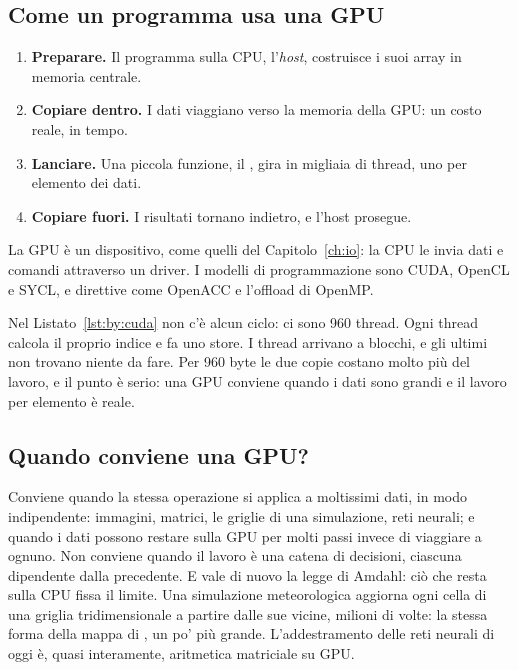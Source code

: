 \subsection{Come un programma usa una GPU}

\begin{enumerate}
\item \textbf{Preparare.} Il programma sulla CPU, l'\emph{host}, costruisce i
  suoi array in memoria centrale.
\item \textbf{Copiare dentro.} I dati viaggiano verso la memoria della GPU: un
  costo reale, in tempo.
\item \textbf{Lanciare.} Una piccola funzione, il , gira in
  migliaia di thread, uno per elemento dei dati.
\item \textbf{Copiare fuori.} I risultati tornano indietro, e l'host prosegue.
\end{enumerate}

La GPU è un dispositivo, come quelli del Capitolo~\ref{ch:io}: la CPU le invia
dati e comandi attraverso un driver. I modelli di programmazione sono CUDA,
OpenCL e SYCL, e direttive come OpenACC e l'offload di OpenMP.


Nel Listato~\ref{lst:by:cuda} non c'è alcun ciclo: ci sono 960 thread. Ogni
thread calcola il proprio indice e fa uno store. I thread arrivano a blocchi,
e gli ultimi non trovano niente da fare. Per 960 byte le due copie costano
molto più del lavoro, e il punto è serio: una GPU conviene quando i dati sono
grandi e il lavoro per elemento è reale.

\subsection{Quando conviene una GPU?}

Conviene quando la stessa operazione si applica a moltissimi dati, in modo
indipendente: immagini, matrici, le griglie di una simulazione, reti neurali; e
quando i dati possono restare sulla GPU per molti passi invece di viaggiare a
ognuno. Non conviene quando il lavoro è una catena di decisioni, ciascuna
dipendente dalla precedente. E vale di nuovo la legge di Amdahl: ciò che resta
sulla CPU fissa il limite. Una simulazione meteorologica aggiorna ogni cella di
una griglia tridimensionale a partire dalle sue vicine, milioni di volte: la
stessa forma della mappa di \vermone, un po' più grande. L'addestramento delle
reti neurali di oggi è, quasi interamente, aritmetica matriciale su GPU.

